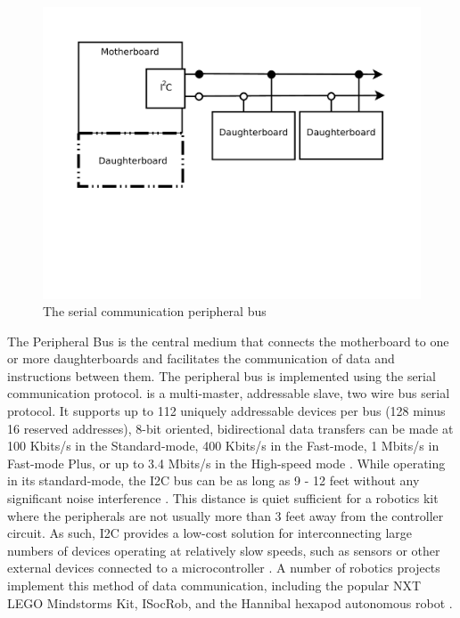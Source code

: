 	\begin{figure}[h]
	  \begin{center}
	    \includegraphics[width=1.0\columnwidth]{Figures/pbus.pdf}
	    \caption{The serial communication peripheral \iic bus}
	  \end{center}
	\end{figure}
	
	The Peripheral Bus is the central medium that connects the motherboard to one or more daughterboards and facilitates the communication of data and instructions between them. The peripheral bus is implemented using the \iic serial communication protocol. \iic is a multi-master, addressable slave, two wire bus serial protocol. It supports up to 112 uniquely addressable devices per bus (128 minus 16 reserved addresses), 8-bit oriented, bidirectional data transfers can be made at 100 Kbits/s in the Standard-mode, 400 Kbits/s in the Fast-mode, 1 Mbits/s in Fast-mode Plus, or up to 3.4 Mbits/s in the High-speed mode \cite{indec}. While operating in its standard-mode, the I2C bus can be as long as 9 - 12 feet without any significant noise interference \cite{nonoise}. This distance is quiet sufficient for a robotics kit where the peripherals are not usually more than 3 feet away from the controller circuit. As such, I2C provides a low-cost solution for interconnecting large numbers of devices operating at relatively slow speeds, such as sensors or other external devices connected to a microcontroller \cite{again}. A number of robotics projects implement this method of data communication, including the popular NXT LEGO Mindstorms Kit, ISocRob, and the Hannibal hexapod autonomous robot \cite{nuffadem}.
	
